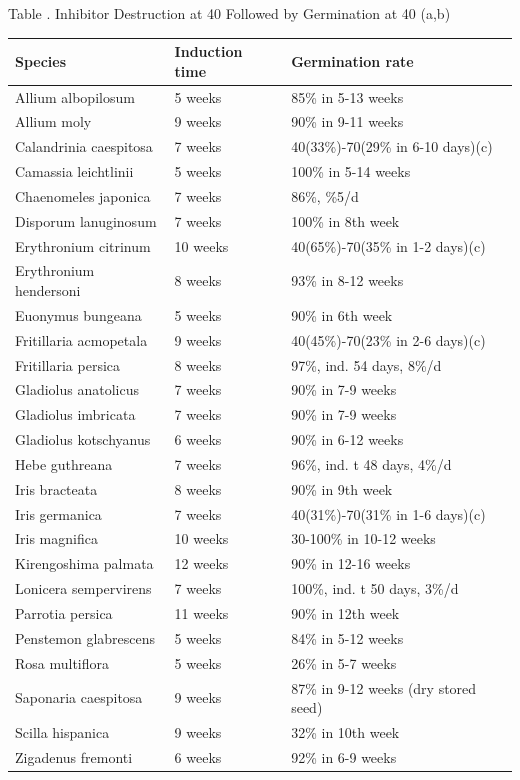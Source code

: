 \begin{table}[h!]

\begin{center}
Table \thetable. Inhibitor Destruction at 40 Followed by Germination at 40 (a,b)
\end{center}

\begin{tabular}{|l|l|l|}
\hline
Species & Induction time & Germination rate \\
\hline
Allium albopilosum & 5 weeks & 85\% in 5-13 weeks \\
Allium moly & 9 weeks & 90\% in 9-11 weeks \\
Calandrinia caespitosa & 7 weeks & 40(33\%)-70(29\% in 6-10 days)(c) \\
Camassia leichtlinii & 5 weeks & 100\% in 5-14 weeks \\
Chaenomeles japonica & 7 weeks & 86\%, \%5/d \\
Disporum lanuginosum & 7 weeks & 100\% in 8th week \\
Erythronium citrinum & 10 weeks & 40(65\%)-70(35\% in 1-2 days)(c) \\
Erythronium hendersoni & 8 weeks & 93\% in 8-12 weeks \\
Euonymus bungeana & 5 weeks & 90\% in 6th week \\
Fritillaria acmopetala & 9 weeks & 40(45\%)-70(23\% in 2-6 days)(c) \\
Fritillaria persica & 8 weeks & 97\%, ind. 54 days, 8\%/d \\
Gladiolus anatolicus & 7 weeks & 90\% in 7-9 weeks \\
Gladiolus imbricata & 7 weeks & 90\% in 7-9 weeks \\
Gladiolus kotschyanus & 6 weeks & 90\% in 6-12 weeks \\
Hebe guthreana & 7 weeks & 96\%, ind. t 48 days, 4\%/d \\
Iris bracteata & 8 weeks & 90\% in 9th week \\
Iris germanica & 7 weeks & 40(31\%)-70(31\% in 1-6 days)(c) \\
Iris magnifica & 10 weeks & 30-100\% in 10-12 weeks \\
Kirengoshima palmata & 12 weeks & 90\% in 12-16 weeks \\
Lonicera sempervirens & 7 weeks & 100\%, ind. t 50 days, 3\%/d \\
Parrotia persica & 11 weeks & 90\% in 12th week \\
Penstemon glabrescens & 5 weeks & 84\% in 5-12 weeks \\
Rosa multiflora & 5 weeks & 26\% in 5-7 weeks \\
Saponaria caespitosa & 9 weeks & 87\% in 9-12 weeks (dry stored seed) \\
Scilla hispanica & 9 weeks & 32\% in 10th week \\
Zigadenus fremonti & 6 weeks & 92\% in 6-9 weeks \\
\hline
\end{tabular}


\end{table}
